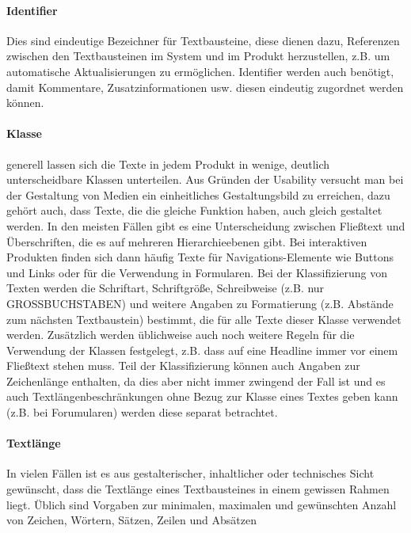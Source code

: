 \paragraph{Identifier} Dies sind eindeutige Bezeichner für Textbausteine, diese dienen dazu, Referenzen zwischen den Textbausteinen im System und im Produkt herzustellen, z.B. um automatische Aktualisierungen zu ermöglichen. Identifier werden auch benötigt, damit Kommentare, Zusatzinformationen usw. diesen eindeutig zugordnet werden können.

\paragraph{Klasse} generell lassen sich die Texte in jedem Produkt in wenige, deutlich unterscheidbare Klassen unterteilen. Aus Gründen der Usability versucht man bei der Gestaltung von Medien ein einheitliches Gestaltungsbild zu erreichen, dazu gehört auch, dass Texte, die die gleiche Funktion haben, auch gleich gestaltet werden. In den meisten Fällen gibt es eine Unterscheidung zwischen Fließtext und Überschriften, die es auf mehreren Hierarchieebenen gibt. Bei interaktiven Produkten finden sich dann häufig Texte für Navigations-Elemente wie Buttons und Links oder für die Verwendung in Formularen. Bei der Klassifizierung von Texten werden die Schriftart, Schriftgröße, Schreibweise  (z.B. nur GROSSBUCHSTABEN) und weitere Angaben zu Formatierung (z.B. Abstände zum nächsten Textbaustein) bestimmt, die für alle Texte dieser Klasse verwendet werden. Zusätzlich werden üblichweise auch noch weitere Regeln für die Verwendung der Klassen festgelegt, z.B. dass auf eine Headline immer vor einem Fließtext stehen muss. Teil der Klassifizierung können auch Angaben zur Zeichenlänge enthalten, da dies aber nicht immer zwingend der Fall ist und es auch Textlängenbeschränkungen ohne Bezug zur Klasse eines Textes geben kann (z.B. bei Forumularen) werden diese separat betrachtet.

\paragraph{Textlänge} In vielen Fällen ist es aus gestalterischer, inhaltlicher oder technisches Sicht gewünscht, dass die Textlänge eines Textbausteines in einem gewissen Rahmen liegt. Üblich sind Vorgaben zur minimalen, maximalen und gewünschten Anzahl von Zeichen, Wörtern, Sätzen, Zeilen und Absätzen

